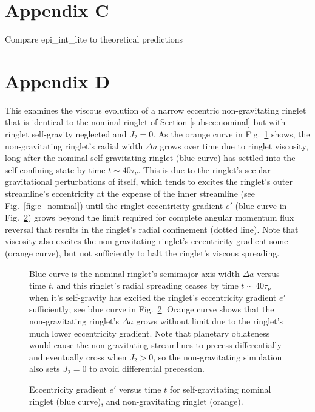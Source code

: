 \documentclass[preprint]{aastex62}
\begin{document}
\section{Appendix C}
\label{sec:Appendix C}

Compare epi\_int\_lite to theoretical predictions

\section{Appendix D}
\label{sec:Appendix D}

This examines the viscous evolution of a narrow eccentric non-gravitating
ringlet that is identical to the nominal ringlet of Section \ref{subsec:nominal} but
with ringlet self-gravity neglected and $J_2=0$.
As the orange curve in Fig.\ \ref{fig:da_nogravity} shows, the non-gravitating ringlet's
radial width $\Delta a$ grows over time due to ringlet viscosity, 
long after the nominal self-gravitating ringlet (blue curve)
has settled into the self-confining state by time $t\sim40\tau_\nu$. This is due to the
ringlet's secular gravitational perturbations of itself,
which tends to excites the ringlet's outer streamline's eccentricity at the expense
of the inner streamline (see Fig.\ \ref{fig:e_nominal}) until the ringlet eccentricity gradient $e'$
(blue curve in Fig.\ \ref{fig:de_prime_nogravity}) grows beyond the
limit required for complete angular momentum flux reversal 
that results in the ringlet's radial confinement (dotted line). 
Note that viscosity also excites the non-gravitating
ringlet's eccentricity gradient some (orange curve), but not sufficiently to halt the ringlet's 
viscous spreading.

\begin{figure}
    \caption{
        \label{fig:da_nogravity}
        Blue curve is the nominal ringlet's semimajor axis width $\Delta a$ versus time $t$,
        and this ringlet's radial spreading ceases by time $t\sim40\tau_\nu$ when it's self-gravity
        has excited the ringlet's eccentricity gradient $e'$ sufficiently; 
        see blue curve in Fig.\ \ref{fig:de_prime_nogravity}. Orange curve shows that
        the non-gravitating ringlet's $\Delta a$ grows without limit due to the ringlet's
        much lower eccentricity gradient. Note that planetary oblateness would
        cause the non-gravitating streamlines to precess differentially and eventually cross
        when $J_2>0$, so the non-gravitating simulation also sets $J_2=0$ 
        to avoid differential precession.
    }
\end{figure}

\begin{figure}
    \caption{
        \label{fig:de_prime_nogravity}
        Eccentricity gradient $e'$ versus time $t$ for self-gravitating nominal ringlet (blue curve),
        and non-gravitating ringlet (orange).
    }
\end{figure}



\end{document}
